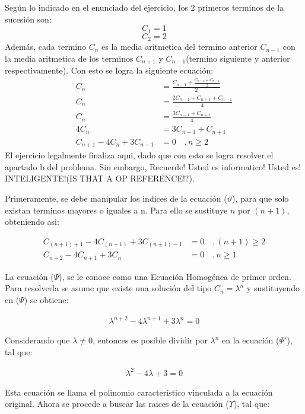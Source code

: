Según lo indicado en el enunciado del ejercicio, los 2 primeros terminos de la sucesión son:
$$C_1=1$$
$$C_2=2$$
Además, cada termino $C_n$ es la media aritmetica del termino anterior $C_{n-1}$ con la media aritmetica de los terminos $C_{n+1}$ y $C_{n-1}$(termino siguiente y anterior respectivamente). Con esto se logra la siguiente ecuación:
\begin{align*}
    C_n &= \frac{C_{n-1} + \frac{C_{n+1}+C_{n-1}}{2}}{2} \\
    C_n &= \frac{2C_{n-1} + C_{n+1} + C_{n-1}}{4} \\
    C_n &= \frac{3C_{n-1} + C_{n+1}}{4} \\
    4C_n &= 3C_{n-1} + C_{n+1} \\
    C_{n+1} -4C_n + 3C_{n-1} &= 0 \quad ,n \ge 2  \tag{$\vartheta$}
\end{align*}
El ejercicio legalmente finaliza aqui, dado que con esto se logra resolver el apartado b del problema. Sin embargo, Recuerde! Usted es informatico! Usted es! INTELIGENTE!(IS THAT A OP REFERENCE!?).

Primeramente, se debe manipular los indices de la ecuación ($\vartheta$), para que solo existan terminos mayores o iguales a n. Para ello se sustituye $n$ por $(n+1)$, obteniendo asi:

\begin{align*}
    C_{(n+1)+1}-4C_{(n+1)}+3C_{(n+1)-1}&=0 \quad ,(n+1) \ge 2 \\
    C_{n+2}-4C_{n+1}+3C_{n}&=0 \quad ,n \ge 1 \tag{$\Psi$}
\end{align*}

La ecuación ({$\Psi$}), se le conoce como una Ecuación Homogénea de primer orden. Para resolverla se asume que existe una solución del tipo $C_n = \lambda^n$ y sustituyendo en ({$\Psi$}) se obtiene:

\begin{align*}
\lambda^{n+2} -4\lambda^{n+1} + 3\lambda^{n} = 0 \tag{$\Psi'$}
\end{align*}


Considerando que $\lambda\neq0$, entonces es posible dividir por $\lambda^n$ en la ecuación ($\Psi'$), tal que:

\begin{align*}
  \lambda^{2} -4\lambda + 3 = 0 \tag{$\Upsilon$}  
\end{align*}

Esta ecuación se llama el polinomio característico vinculada a la ecuación original. Ahora se procede a buscar las raices de la ecuación ($\Upsilon$), tal que:
 
